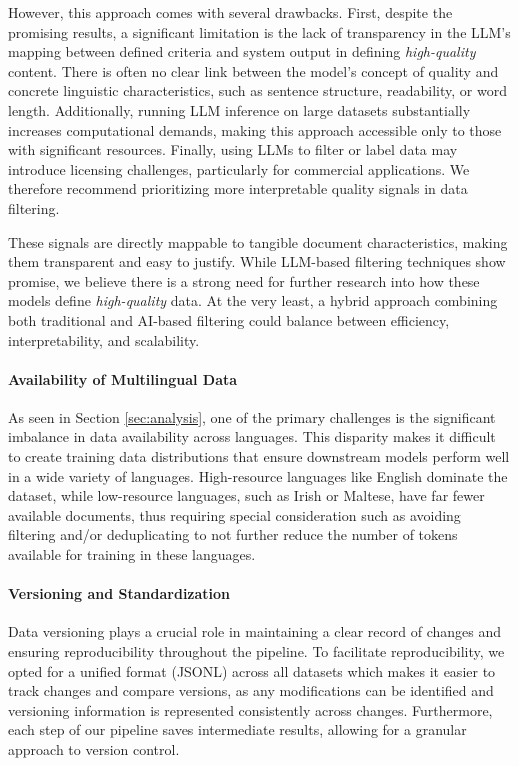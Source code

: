 However, this approach comes with several drawbacks. First, despite the 
promising results, a significant limitation is the lack of transparency in the LLM's mapping between defined criteria and system output in defining \textsl{high-quality} content. There is often 
no clear link between the model’s concept of quality and concrete linguistic 
characteristics, such as sentence structure, readability, or word length. 
Additionally, running LLM inference on large datasets substantially increases 
computational demands, making this approach accessible only to those with 
significant resources. Finally, using LLMs to filter or label data may 
introduce licensing challenges, particularly for commercial applications. We therefore recommend prioritizing more interpretable quality signals 
in data filtering. 

These signals are directly mappable to tangible document 
characteristics, making them transparent and easy to justify. While LLM-based 
filtering techniques show promise, we believe there is a strong need for 
further research into how these models define \textit{high-quality} data. At the 
very least, a hybrid approach combining both traditional and AI-based 
filtering could balance between efficiency, interpretability, 
and scalability.

\paragraph{Availability of Multilingual Data}

As seen in Section \ref{sec:analysis}, one of the primary 
challenges is the significant imbalance in data availability across 
languages. This disparity makes it difficult to create training data 
distributions that ensure downstream models perform well in a wide variety 
of languages. High-resource languages like English dominate the dataset, 
while low-resource languages, such as Irish or Maltese, have far fewer 
available documents, thus requiring special consideration such as avoiding 
filtering and/or deduplicating
to not further reduce the number of tokens available for training in these 
languages.


\paragraph{Versioning and Standardization}

Data versioning plays a crucial role in maintaining a clear record 
of changes and ensuring reproducibility throughout the pipeline. To 
facilitate reproducibility, we opted for a unified format (JSONL) across all 
datasets which makes it easier to track changes and compare versions, 
as any modifications can be identified and versioning information is represented consistently across changes. Furthermore, each step 
of our pipeline saves intermediate results, allowing for a granular 
approach to version control.

